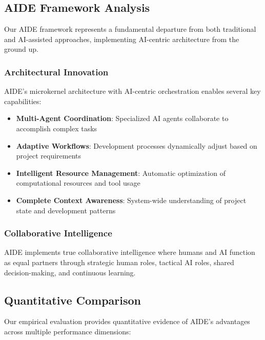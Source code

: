 \subsection{AIDE Framework Analysis}

Our AIDE framework represents a fundamental departure from both traditional and AI-assisted approaches, implementing AI-centric architecture from the ground up.

\subsubsection{Architectural Innovation}

AIDE's microkernel architecture with AI-centric orchestration enables several key capabilities:

\begin{itemize}
    \item \textbf{Multi-Agent Coordination}: Specialized AI agents collaborate to accomplish complex tasks
    \item \textbf{Adaptive Workflows}: Development processes dynamically adjust based on project requirements
    \item \textbf{Intelligent Resource Management}: Automatic optimization of computational resources and tool usage
    \item \textbf{Complete Context Awareness}: System-wide understanding of project state and development patterns
\end{itemize}

\subsubsection{Collaborative Intelligence}

AIDE implements true collaborative intelligence where humans and AI function as equal partners through strategic human roles, tactical AI roles, shared decision-making, and continuous learning.

\subsection{Quantitative Comparison}

Our empirical evaluation provides quantitative evidence of AIDE's advantages across multiple performance dimensions:

